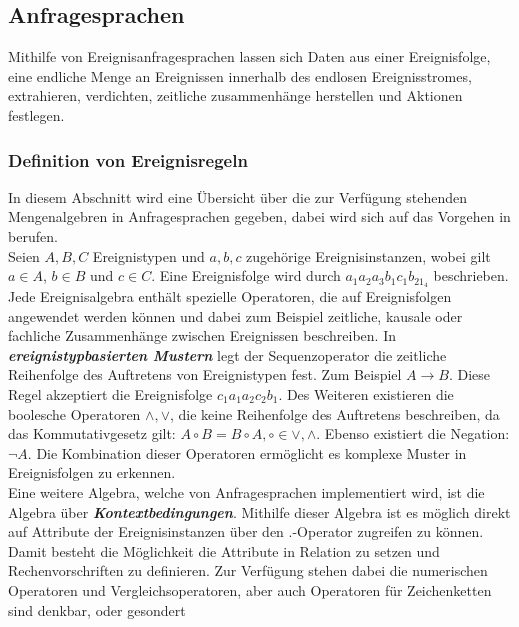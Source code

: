 \documentclass{acm_proc_article-sp}
\begin{document}
%
%
\subsection{Anfragesprachen}\label{kap:anfragesprachen}
\vspace{0.1cm}
Mithilfe von Ereignisanfragesprachen lassen sich Daten aus einer Ereignisfolge, eine 
endliche Menge an Ereignissen innerhalb des endlosen Ereignisstromes, extrahieren, 
verdichten, zeitliche zusammenhänge herstellen und Aktionen festlegen.

\subsubsection{Definition von Ereignisregeln}\label{kap:ereignisregeln}
\vspace{0.1cm}
In diesem Abschnitt wird eine Übersicht über die zur Verfügung stehenden Mengenalgebren 
in Anfragesprachen gegeben, dabei wird sich auf das Vorgehen in \cite{bruns} berufen.\\
Seien $A,B,C$ Ereignistypen und $a,b,c$ zugehörige Ereignisinstanzen, wobei gilt 
$a \in A$, $b \in B$ und $c \in C$. Eine Ereignisfolge wird durch $a_1a_2a_3b_1c_1b_21_4$
beschrieben.\\
Jede Ereignisalgebra enthält spezielle Operatoren, die auf Ereignisfolgen angewendet 
werden können und dabei zum Beispiel zeitliche, kausale oder fachliche Zusammenhänge 
zwischen 
Ereignissen beschreiben. In \textbf{\textit{ereignistypbasierten Mustern}} legt der 
Sequenzoperator die zeitliche Reihenfolge des Auftretens von Ereignistypen fest. Zum 
Beispiel $A \rightarrow B$. Diese Regel akzeptiert die Ereignisfolge $c_1a_1a_2c_2b_1$. 
Des Weiteren existieren die boolesche Operatoren $\land , \lor$, die keine Reihenfolge 
des Auftretens beschreiben, da das Kommutativgesetz gilt: $A \circ B = B \circ A, \circ 
\in {\lor,\land}$. Ebenso existiert die Negation: $\neg A$. Die Kombination dieser 
Operatoren ermöglicht es komplexe Muster in Ereignisfolgen zu erkennen.\\
Eine weitere Algebra, welche von Anfragesprachen implementiert wird, ist die Algebra über 
\textbf{\textit{Kontextbedingungen}}. Mithilfe dieser Algebra ist es möglich direkt 
auf Attribute der Ereignisinstanzen über den $.$-Operator zugreifen zu können. Damit 
besteht die Möglichkeit die Attribute in Relation zu setzen und Rechenvorschriften zu 
definieren. Zur Verfügung stehen dabei die numerischen Operatoren und 
Vergleichsoperatoren, aber auch Operatoren für Zeichenketten sind denkbar, oder gesondert 
\end{document}
